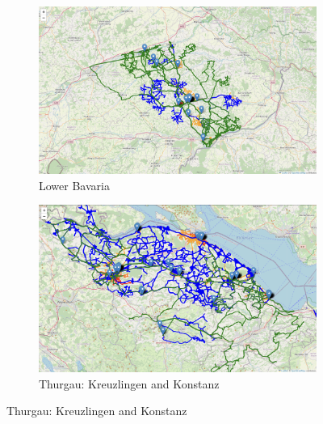 \documentclass[a4paper,12pt,twoside]{scrreprt}
\begin{document}
\begin{figure}[p]
  \centering

  \begin{subfigure}[b]{0.495\textwidth}
    \centering

    \includegraphics[width=\textwidth]{Figures/clustering_map/clustering_result_map_rural_area1.png}
    \caption{Lower Bavaria}
    \label{fig:clustering_map_visulaization_rural}
  \end{subfigure}
  \hfill
  \begin{subfigure}[b]{0.495\textwidth}
    \centering

    \includegraphics[width=\textwidth]{Figures/clustering_map/clustering_result_map_konstanz_area_town1.png}
    \caption{Thurgau: Kreuzlingen and Konstanz}
    \label{fig:clustering_map_visulaization_konstanz}
  \end{subfigure}

  \vspace{1cm}


\end{figure}
\end{document}
